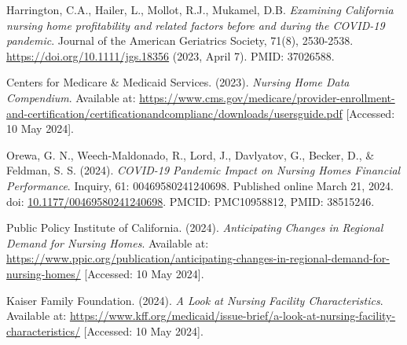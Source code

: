 \documentclass{article}
\theoremstyle{mytheoremstyle}
\theoremstyle{mytheoremstyle}
\theoremstyle{myproblemstyle}
\begin{document}
\begin{thebibliography}{9}
Harrington, C.A., Hailer, L., Mollot, R.J., Mukamel, D.B. 
\textit{Examining California nursing home profitability and related factors before and during the COVID-19 pandemic}.
Journal of the American Geriatrics Society, 71(8), 2530-2538. 
\url{https://doi.org/10.1111/jgs.18356} (2023, April 7). PMID: 37026588.

Centers for Medicare \& Medicaid Services. (2023).
\textit{Nursing Home Data Compendium}.
Available at: \url{https://www.cms.gov/medicare/provider-enrollment-and-certification/certificationandcomplianc/downloads/usersguide.pdf} [Accessed: 10 May 2024].

Orewa, G. N., Weech-Maldonado, R., Lord, J., Davlyatov, G., Becker, D., \& Feldman, S. S. (2024).
\textit{COVID-19 Pandemic Impact on Nursing Homes Financial Performance}.
Inquiry, 61: 00469580241240698. Published online March 21, 2024. doi: \href{https://doi.org/10.1177/00469580241240698}{10.1177/00469580241240698}.
PMCID: PMC10958812, PMID: 38515246.

Public Policy Institute of California. (2024).
\textit{Anticipating Changes in Regional Demand for Nursing Homes}.
Available at: \url{https://www.ppic.org/publication/anticipating-changes-in-regional-demand-for-nursing-homes/} [Accessed: 10 May 2024].

Kaiser Family Foundation. (2024).
\textit{A Look at Nursing Facility Characteristics}.
Available at: \url{https://www.kff.org/medicaid/issue-brief/a-look-at-nursing-facility-characteristics/} [Accessed: 10 May 2024].

\end{thebibliography}


\end{document}
